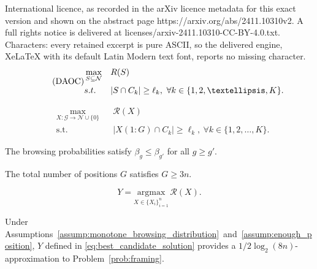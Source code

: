 \documentclass[10pt,a4paper]{amsart}
\begin{document}
International licence, as recorded in the arXiv licence metadata for this exact version and shown on the abstract page https://arxiv.org/abs/2411.10310v2. A full rights notice is delivered at licenses/arxiv-2411.10310-CC-BY-4.0.txt. Characters: every retained excerpt is pure ASCII, so the delivered engine, XeLaTeX with its default Latin Modern text font, reports no missing character.
\begin{equation}
\label{prob:deterministic_single_segment}
\tag{DAOC}
\begin{aligned}
&\max_{S\subseteq\mathcal{N}} && R(S)\\
&\textup{s.t.} && |S\cap C_k|\geq \ell_k,\ \forall k\in\{1,2,\dots,K\}.\\
\end{aligned}
\end{equation}

\begin{equation}
\label{prob:framing}
\begin{aligned}
&\max_{X:\mathcal{G}\to\mathcal{N}\cup\{0\}} && \mathcal{R}(X)\\
&\text{s.t.} && |X(1:G)\cap C_k|\geq \ell_k,\ \forall k\in\{1,2,\dots,K\}.
\end{aligned}
\end{equation}

\begin{assumption}\label{assump:monotone_browsing_distribution}
The browsing probabilities satisfy $\beta_g\leq \beta_{g'}$ for all $g\geq g'$.
\end{assumption}

\begin{assumption}\label{assump:enough_position}
The total number of positions $G$ satisfies $G\geq 3n$.
\end{assumption}

\begin{equation}\label{eq:best_candidate_solution}
Y=\underset{X\in\{X_i\}_{i=1}^n}{\mathrm{argmax}}\,\mathcal{R}(X).
\end{equation}

\begin{theorem}
Under Assumptions~\ref{assump:monotone_browsing_distribution}~and~\ref{assump:enough_position}, $Y$ defined in \eqref{eq:best_candidate_solution} provides a $1/2\log_2(8n)$-approximation to Problem~\eqref{prob:framing}.
\end{theorem}
\end{document}
